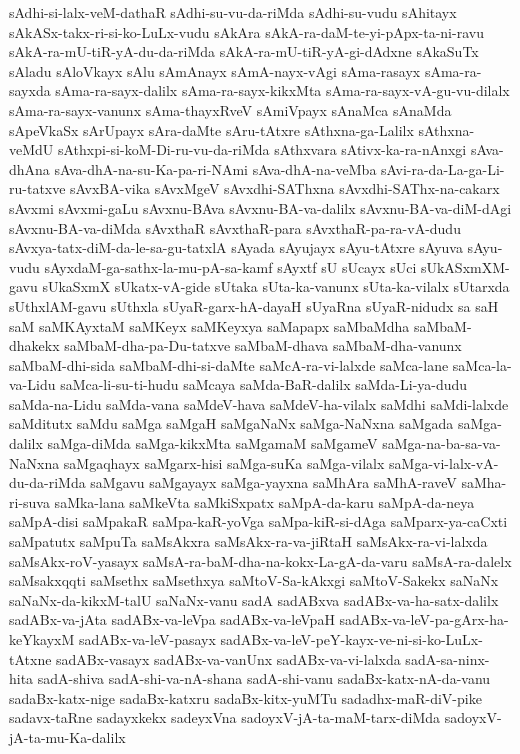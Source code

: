 {sAdhi-si-lalx-veM-dathaR
sAdhi-su-vu-da-riMda
sAdhi-su-vudu
sAhitayx
sAkASx-takx-ri-si-ko-LuLx-vudu
sAkAra
sAkA-ra-daM-te-yi-pApx-ta-ni-ravu
sAkA-ra-mU-tiR-yA-du-da-riMda
sAkA-ra-mU-tiR-yA-gi-dAdxne
sAkaSuTx
sAladu
sAloVkayx
sAlu
sAmAnayx
sAmA-nayx-vAgi
sAma-rasayx
sAma-ra-sayxda
sAma-ra-sayx-dalilx
sAma-ra-sayx-kikxMta
sAma-ra-sayx-vA-gu-vu-dilalx
sAma-ra-sayx-vanunx
sAma-thayxRveV
sAmiVpayx
sAnaMca
sAnaMda
sApeVkaSx
sArUpayx
sAra-daMte
sAru-tAtxre
sAthxna-ga-Lalilx
sAthxna-veMdU
sAthxpi-si-koM-Di-ru-vu-da-riMda
sAthxvara
sAtivx-ka-ra-nAnxgi
sAva-dhAna
sAva-dhA-na-su-Ka-pa-ri-NAmi
sAva-dhA-na-veMba
sAvi-ra-da-La-ga-Li-ru-tatxve
sAvxBA-vika
sAvxMgeV
sAvxdhi-SAThxna
sAvxdhi-SAThx-na-cakarx
sAvxmi
sAvxmi-gaLu
sAvxnu-BAva
sAvxnu-BA-va-dalilx
sAvxnu-BA-va-diM-dAgi
sAvxnu-BA-va-diMda
sAvxthaR
sAvxthaR-para
sAvxthaR-pa-ra-vA-dudu
sAvxya-tatx-diM-da-le-sa-gu-tatxlA
sAyada
sAyujayx
sAyu-tAtxre
sAyuva
sAyu-vudu
sAyxdaM-ga-sathx-la-mu-pA-sa-kamf
sAyxtf
sU
sUcayx
sUci
sUkASxmXM-gavu
sUkaSxmX
sUkatx-vA-gide
sUtaka
sUta-ka-vanunx
sUta-ka-vilalx
sUtarxda
sUthxlAM-gavu
sUthxla
sUyaR-garx-hA-dayaH
sUyaRna
sUyaR-nidudx
sa
saH
saM
saMKAyxtaM
saMKeyx
saMKeyxya
saMapapx
saMbaMdha
saMbaM-dhakekx
saMbaM-dha-pa-Du-tatxve
saMbaM-dhava
saMbaM-dha-vanunx
saMbaM-dhi-sida
saMbaM-dhi-si-daMte
saMcA-ra-vi-lalxde
saMca-lane
saMca-la-va-Lidu
saMca-li-su-ti-hudu
saMcaya
saMda-BaR-dalilx
saMda-Li-ya-dudu
saMda-na-Lidu
saMda-vana
saMdeV-hava
saMdeV-ha-vilalx
saMdhi
saMdi-lalxde
saMditutx
saMdu
saMga
saMgaH
saMgaNaNx
saMga-NaNxna
saMgada
saMga-dalilx
saMga-diMda
saMga-kikxMta
saMgamaM
saMgameV
saMga-na-ba-sa-va-NaNxna
saMgaqhayx
saMgarx-hisi
saMga-suKa
saMga-vilalx
saMga-vi-lalx-vA-du-da-riMda
saMgavu
saMgayayx
saMga-yayxna
saMhAra
saMhA-raveV
saMha-ri-suva
saMka-lana
saMkeVta
saMkiSxpatx
saMpA-da-karu
saMpA-da-neya
saMpA-disi
saMpakaR
saMpa-kaR-yoVga
saMpa-kiR-si-dAga
saMparx-ya-caCxti
saMpatutx
saMpuTa
saMsAkxra
saMsAkx-ra-va-jiRtaH
saMsAkx-ra-vi-lalxda
saMsAkx-roV-yasayx
saMsA-ra-baM-dha-na-kokx-La-gA-da-varu
saMsA-ra-dalelx
saMsakxqqti
saMsethx
saMsethxya
saMtoV-Sa-kAkxgi
saMtoV-Sakekx
saNaNx
saNaNx-da-kikxM-talU
saNaNx-vanu
sadA
sadABxva
sadABx-va-ha-satx-dalilx
sadABx-va-jAta
sadABx-va-leVpa
sadABx-va-leVpaH
sadABx-va-leV-pa-gArx-ha-keYkayxM
sadABx-va-leV-pasayx
sadABx-va-leV-peY-kayx-ve-ni-si-ko-LuLx-tAtxne
sadABx-vasayx
sadABx-va-vanUnx
sadABx-va-vi-lalxda
sadA-sa-ninx-hita
sadA-shiva
sadA-shi-va-nA-shana
sadA-shi-vanu
sadaBx-katx-nA-da-vanu
sadaBx-katx-nige
sadaBx-katxru
sadaBx-kitx-yuMTu
sadadhx-maR-diV-pike
sadavx-taRne
sadayxkekx
sadeyxVna
sadoyxV-jA-ta-maM-tarx-diMda
sadoyxV-jA-ta-mu-Ka-dalilx
}
